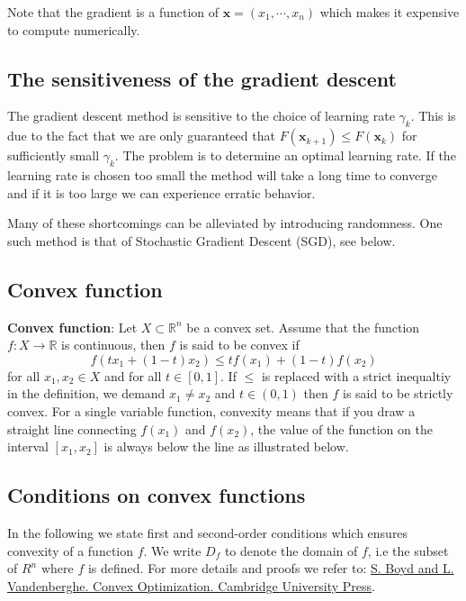 \documentclass[%
oneside,                 %
final,                   %
10pt]{article}
\begin{document}
Note that the gradient is a function of $\mathbf{x} =
(x_1,\cdots,x_n)$ which makes it expensive to compute numerically.

\subsection{The sensitiveness of the gradient descent}

The gradient descent method 
is sensitive to the choice of learning rate $\gamma_k$. This is due
to the fact that we are only guaranteed that $F(\mathbf{x}_{k+1}) \leq
F(\mathbf{x}_k)$ for sufficiently small $\gamma_k$. The problem is to
determine an optimal learning rate. If the learning rate is chosen too
small the method will take a long time to converge and if it is too
large we can experience erratic behavior.

Many of these shortcomings can be alleviated by introducing
randomness. One such method is that of Stochastic Gradient Descent
(SGD), see below.

\subsection{Convex function}

\textbf{Convex function}: Let $X \subset \mathbb{R}^n$ be a convex set. Assume that the function $f: X \rightarrow \mathbb{R}$ is continuous, then $f$ is said to be convex if $$f(tx_1 + (1-t)x_2) \leq tf(x_1) + (1-t)f(x_2) $$ for all $x_1, x_2 \in X$ and for all $t \in [0,1]$. If $\leq$ is replaced with a strict inequaltiy in the definition, we demand $x_1 \neq x_2$ and $t\in(0,1)$ then $f$ is said to be strictly convex. For a single variable function, convexity means that if you draw a straight line connecting $f(x_1)$ and $f(x_2)$, the value of the function on the interval $[x_1,x_2]$ is always below the line as illustrated below.

\subsection{Conditions on convex functions}

In the following we state first and second-order conditions which
ensures convexity of a function $f$. We write $D_f$ to denote the
domain of $f$, i.e the subset of $R^n$ where $f$ is defined. For more
details and proofs we refer to: \href{{http://stanford.edu/boyd/cvxbook/, 2004}}{S. Boyd and L. Vandenberghe. Convex Optimization. Cambridge University Press}.
\end{document}
